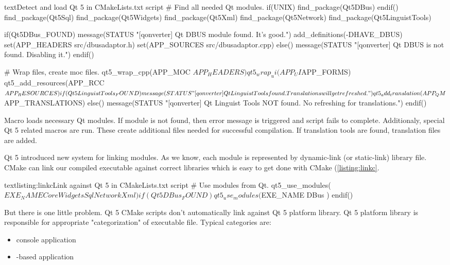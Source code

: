 \begin{fdoccode}{text}{}{Detect and load Qt 5 in CMakeLists.txt script}
# Find all needed Qt modules.
if(UNIX)
    find_package(Qt5DBus)
endif()
find_package(Qt5Sql)
find_package(Qt5Widgets)
find_package(Qt5Xml)
find_package(Qt5Network)
find_package(Qt5LinguistTools)

if(Qt5DBus_FOUND)
    message(STATUS "[qonverter] Qt DBUS module found. It's good.")
    add_definitions(-DHAVE_DBUS)
    set(APP_HEADERS src/dbusadaptor.h)
    set(APP_SOURCES src/dbusadaptor.cpp)
else()
    message(STATUS "[qonverter] Qt DBUS is not found. Disabling it.")
endif()

# Wrap files, create moc files.
qt5_wrap_cpp(APP_MOC ${APP_HEADERS})
qt5_wrap_ui(APP_UI ${APP_FORMS})
qt5_add_resources(APP_RCC ${APP_RESOURCES})

if(Qt5LinguistTools_FOUND)
    message(STATUS "[qonverter] Qt Linguist Tools found. Translations will get refreshed.")
    qt5_add_translation(APP_QM ${APP_TRANSLATIONS})
else()
    message(STATUS "[qonverter] Qt Linguist Tools NOT found. No refreshing for translations.")
endif()
\end{fdoccode}

Macro loads necessary Qt modules. If module is not found, then error message is triggered and script fails to complete. Additionaly, special Qt 5 related macros are run. These create additional files needed for successful compilation. If translation tools are found, translation files are added.

Qt 5 introduced new system for linking modules. As we know, each module is represented by dynamic-link (or static-link) library file. CMake can link our compiled executable against correct libraries which is easy to get done with CMake (\autoref{listing:linkc}.

\begin{fdoccode}{text}{listing:linkc}{Link against Qt 5 in CMakeLists.txt script}
# Use modules from Qt.
qt5_use_modules(${EXE_NAME}
    Core
    Widgets
    Sql
    Network
    Xml
)

if(Qt5DBus_FOUND)
    qt5_use_modules(${EXE_NAME}
	DBus
    )
endif()
\end{fdoccode}

But there is one little problem. Qt 5 CMake scripts don't automatically link against Qt 5 platform library. Qt 5 platform library is responsible for appropriate "categorization" of executable file. Typical categories are:
\begin{itemize}
\item console application
\item {}-based application
\end{itemize}

